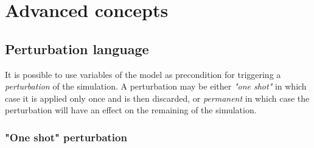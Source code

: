 \documentclass[11pt]{book}
\begin{document}
\chapter{Advanced concepts}\label{chap:advanced}

\section{Perturbation language}\label{sec:mod}

It is possible to use variables of the model as precondition for triggering a \emph{perturbation} of the simulation. A perturbation may be either \emph{"one shot"} in which case it is applied only once and is then discarded, or \emph{permanent} in which case the perturbation will have an effect on the remaining of the simulation.

\subsection{"One shot" perturbation}
\end{document}
